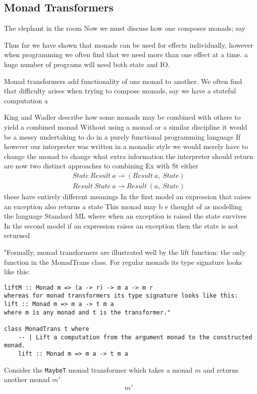\subsection{Monad Transformers}
The elephant in the room
Now we must discuss how one composes monads;
say


Thus far we have shown that monads can be used for effects individually,
however when programming we often find that we need more than one effect
at a time. a huge number of programs will need both state
and IO.

Monad transformers add functionality of one monad to another.
We often find that difficulty arises when trying to compose monads,
say we have a stateful computation a

King and Wadler \cite{king1993combining}
describe how some monads may be combined with others to yield a combined monad
Without using a monad or a similar discipline it would be a messy undertaking
to do in a purely functional programming language
If however our interpreter was written in a monadic style we would merely have
to change the monad to change what extra information the interpreter should return
are now two distinct approaches to combining Ex with St either
\begin{align}
    State\ Result\ a \rightarrow (Result\ a,\ State)\\
    Result\ State\ a \rightarrow Result\ (a,\ State)
\end{align}
these have entirely different meanings
In the first model an expression that raises an exception also returns a state
This monad may b e thought of as modelling the language Standard ML where
when an exception is raised the state survives
In the second model if an expression raises an exception then
the state is not returned

"Formally, monad transformers are illustrated well by the lift function:
the only function in the MonadTrans class.
For regular monads its type signature looks like this:

\begin{verbatim}
liftM :: Monad m => (a -> r) -> m a -> m r
whereas for monad transformers its type signature looks like this:
lift :: Monad m => m a -> t m a
where m is any monad and t is the transformer."

class MonadTrans t where
    -- | Lift a computation from the argument monad to the constructed monad.
    lift :: Monad m => m a -> t m a
\end{verbatim}

Consider the \texttt{MaybeT} monad transformer
which takes a monad $m$ and returns another monad $m\prime$
\begin{equation}
    m\prime
\end{equation}

